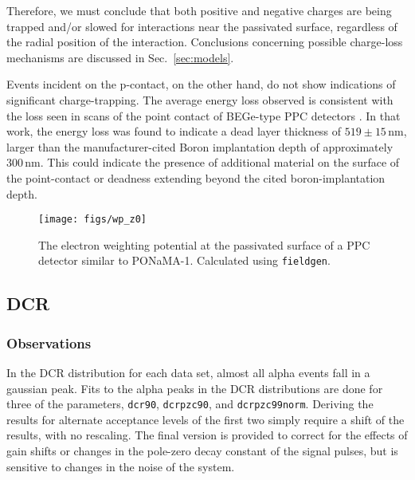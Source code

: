 \documentclass[groupedaddress,rmp,amsmath,amssymb,bibnotes,altaffilletter,twocolumn]{revtex4-1}
\begin{document}
Therefore, we must conclude that both positive and negative charges are being trapped and/or slowed for interactions near the passivated surface, regardless of the radial position of the interaction. Conclusions concerning possible charge-loss mechanisms are discussed in Sec.~\ref{sec:models}.

Events incident on the p-contact, on the other hand, do not show indications of significant charge-trapping. The average energy loss observed is consistent with the loss seen in scans of the point contact of BEGe-type PPC detectors \cite{Agostini_thesis}. In that work, the energy loss was found to indicate a dead layer thickness of $519\pm15$\,nm, larger than the manufacturer-cited Boron implantation depth of approximately 300\,nm. This could indicate the presence of additional material on the surface of the point-contact or deadness extending beyond the cited boron-implantation depth. 

\begin{figure}[]
 \centering
 \texttt{[image: figs/wp\_z0]}
 \caption{The electron weighting potential at the passivated surface of a PPC detector similar to PONaMA-1. Calculated using {\tt fieldgen}.} 
 \label{fig:wp_z0}
\end{figure}

\subsection{DCR}
\subsubsection{Observations}
In the DCR distribution for each data set, almost all alpha events fall in a gaussian peak. Fits to the alpha peaks in the DCR distributions are done for three of the parameters, {\tt dcr90}, {\tt dcrpzc90}, and {\tt dcrpzc99norm}. Deriving the results for alternate acceptance levels of the first two simply require a shift of the results, with no rescaling. The final version is provided to correct for the effects of gain shifts or changes in the pole-zero decay constant of the signal pulses, but is sensitive to changes in the noise of the system. 
\end{document}
